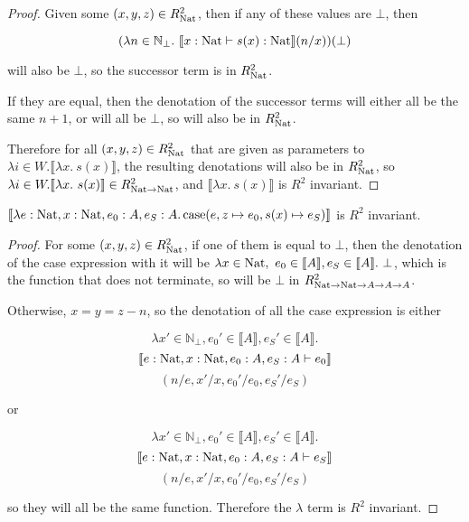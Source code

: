 \vspace{0.25cm}

\begin{proof}
Given some $(x,y,z) \in R_{\operatorname{Nat}}^2$, then if any of these values are $\bot$, then 

\[(\lambda n \in \mathbb{N}_{\bot}. \ \llbracket x : \nat \vdash s(x) : \nat \rrbracket (n/x))(\bot)\]

will also be $\bot$, so the successor term is in $R_{\operatorname{Nat}}^2$.

If they are equal, then the denotation of the successor terms will either all be the same $n + 1$, or will all be $\bot$, so will also be in $R_{\operatorname{Nat}}^2$.

Therefore for all $(x,y,z) \in R_{\operatorname{Nat}}^2$ that are given as parameters to $\lambda i \in W. \llbracket \lambda x . \ s(x) \rrbracket$, the resulting denotations will also be in $R_{\operatorname{Nat}}^2$, so $\lambda i \in W. \llbracket \lambda x . \ s(x) \rrbracket \in R_{\operatorname{Nat} \to \operatorname{Nat}}^2$, and $\llbracket \lambda x . \ s(x) \rrbracket$ is $R^2$ invariant.
\end{proof}


\vspace{0.5cm}

\begin{lem}
$\llbracket \lambda e : \operatorname{Nat}, x : \operatorname{Nat}, e_0 : A, e_S : A. \operatorname{case} (e, z \mapsto e_0, s(x) \mapsto e_S) \rrbracket$ is $R^2$ invariant.
\end{lem}

\begin{proof} For some $(x,y,z) \in R_{\operatorname{Nat}}^2$, if one of them is equal to $\bot$, then the denotation of the case expression with it will be $\lambda x \in \operatorname{Nat}, \ e_0 \in \llbracket A \rrbracket, e_S \in \llbracket A \rrbracket . \ \bot$, which is the function that does not terminate, so will be $\bot$ in $R_{\operatorname{Nat} \to \operatorname{Nat} \to A \to A \to A}^2$.

Otherwise, $x = y = z - n$, so the denotation of all the case expression is either 

\[ \lambda x' \in \mathbb{N}_{\bot}, e_0' \in \llbracket A \rrbracket ,  e_S' \in \llbracket A \rrbracket .\] \[\llbracket e : \operatorname{Nat}, x : \operatorname{Nat}, e_0 : A , e_S : A \vdash e_0 \rrbracket\]
\[ (n/e, x'/x, e_0'/e_0, e_S'/e_S)\]

or 

\[ \lambda x' \in \mathbb{N}_{\bot}, e_0' \in \llbracket A \rrbracket ,  e_S' \in \llbracket A \rrbracket .\] \[\llbracket e : \operatorname{Nat}, x : \operatorname{Nat}, e_0 : A , e_S : A \vdash e_S \rrbracket\]
\[ (n/e, x'/x, e_0'/e_0, e_S'/e_S)\]

so they will all be the same function. Therefore the $\lambda$ term is $R^2$ invariant.

\end{proof}

